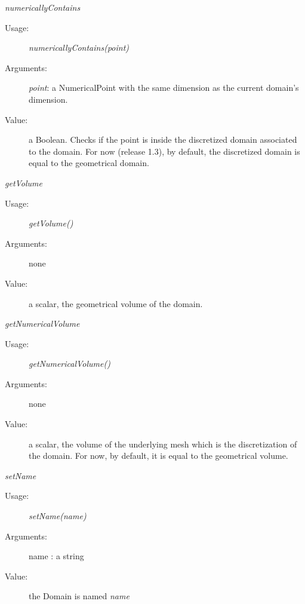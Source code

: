 \begin{description}
\begin{description}
\item \textit{numericallyContains}
\begin{description}
\item[Usage:] \textit{numericallyContains(point)}
\item[Arguments:] \textit{point}: a NumericalPoint with the same dimension as the current domain's dimension.
\item[Value:] a Boolean. Checks if the point is inside the discretized domain associated to the domain.  For now (release 1.3), by default, the discretized domain is equal to the geometrical domain.
\end{description}
\bigskip


\item \textit{getVolume}
\begin{description}
\item[Usage:] \textit{getVolume()}
\item[Arguments:] none
\item[Value:] a scalar, the geometrical volume of the domain.
\end{description}
\bigskip

\item \textit{getNumericalVolume}
\begin{description}
\item[Usage:] \textit{getNumericalVolume()}
\item[Arguments:] none
\item[Value:] a scalar, the volume of the underlying mesh which is the discretization of the domain. For now, by default, it is equal to the geometrical volume.
\end{description}
\bigskip

\item \textit{setName}
\begin{description}
\item[Usage:] \textit{setName(name)}
\item[Arguments:] name : a string
\item[Value:] the Domain is named \textit{name}
\end{description}

\end{description}

\end{description}



\newpage

